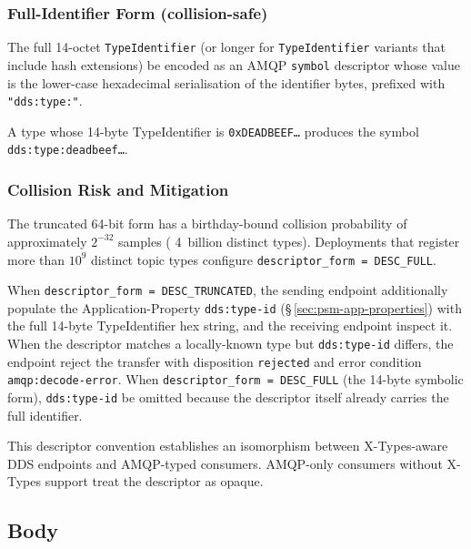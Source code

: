 \documentclass{../styles/zerodds-vendor-spec}
\begin{document}
\subsubsection{Full-Identifier Form (collision-safe)}

The full 14-octet \texttt{TypeIdentifier} (or longer for
\texttt{TypeIdentifier} variants that include hash extensions)
 be encoded as an AMQP \texttt{symbol} descriptor
whose value is the lower-case hexadecimal serialisation of the
identifier bytes, prefixed with \texttt{"dds:type:"}.

\begin{specexample}
A type whose 14-byte TypeIdentifier is
\texttt{0xDEADBEEF\ldots} produces the symbol
\texttt{dds:type:deadbeef\ldots}.
\end{specexample}

\subsubsection{Collision Risk and Mitigation}

The truncated 64-bit form has a birthday-bound collision
probability of approximately $2^{-32}$ samples
( 4~billion distinct types). Deployments that
register more than  $10^9$ distinct topic types
 configure \texttt{descriptor\_form = DESC\_FULL}.

When \texttt{descriptor\_form = DESC\_TRUNCATED}, the sending
endpoint  additionally populate the
Application-Property \texttt{dds:type-id}
(\S\,\ref{sec:psm-app-properties}) with the full 14-byte
TypeIdentifier hex string, and the receiving endpoint
 inspect it. When the descriptor matches a
locally-known type but \texttt{dds:type-id} differs, the
endpoint  reject the transfer with disposition
\texttt{rejected} and error condition
\texttt{amqp:decode-error}. When \texttt{descriptor\_form =
DESC\_FULL} (the 14-byte symbolic form), \texttt{dds:type-id}
 be omitted because the descriptor itself already
carries the full identifier.

\begin{specnote}
This descriptor convention establishes an isomorphism between
X-Types-aware DDS endpoints and AMQP-typed consumers. AMQP-only
consumers without X-Types support  treat the descriptor
as opaque.
\end{specnote}

\subsection{Body}
\end{document}
